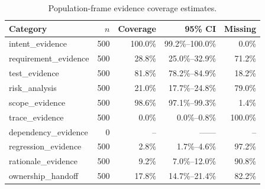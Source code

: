 \begin{table}[t]
\centering
\caption{Population-frame evidence coverage estimates.}
\label{tab:population-evidence-estimates}
\footnotesize
\begin{tabular}{@{}lrrrr@{}}
\toprule
Category & $n$ & Coverage & 95\% CI & Missing \\
\midrule
intent\_evidence & 500 & 100.0\% & 99.2\%--100.0\% & 0.0\% \\
requirement\_evidence & 500 & 28.8\% & 25.0\%--32.9\% & 71.2\% \\
test\_evidence & 500 & 81.8\% & 78.2\%--84.9\% & 18.2\% \\
risk\_analysis & 500 & 21.0\% & 17.7\%--24.8\% & 79.0\% \\
scope\_evidence & 500 & 98.6\% & 97.1\%--99.3\% & 1.4\% \\
trace\_evidence & 500 & 0.0\% & 0.0\%--0.8\% & 100.0\% \\
dependency\_evidence & 0 & -- & ------ & -- \\
regression\_evidence & 500 & 2.8\% & 1.7\%--4.6\% & 97.2\% \\
rationale\_evidence & 500 & 9.2\% & 7.0\%--12.0\% & 90.8\% \\
ownership\_handoff & 500 & 17.8\% & 14.7\%--21.4\% & 82.2\% \\
\bottomrule
\end{tabular}
\end{table}
